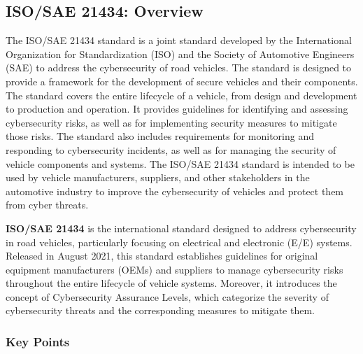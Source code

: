 \subsection{ISO/SAE 21434: Overview}\label{subsec:iso-sae-21434}

The ISO/SAE 21434 standard is a joint standard developed by the International Organization for Standardization (ISO) and the Society of Automotive Engineers (SAE) to address the cybersecurity of road vehicles.
The standard is designed to provide a framework for the development of secure vehicles and their components.
The standard covers the entire lifecycle of a vehicle, from design and development to production and operation.
It provides guidelines for identifying and assessing cybersecurity risks, as well as for implementing security measures to mitigate those risks.
The standard also includes requirements for monitoring and responding to cybersecurity incidents, as well as for managing the security of vehicle components and systems.
The ISO/SAE 21434 standard is intended to be used by vehicle manufacturers,
suppliers, and other stakeholders in the automotive industry to improve the cybersecurity of vehicles and protect them from cyber threats\cite{iso-correlation}.

\textbf{ISO/SAE 21434} is the international standard designed to address cybersecurity in road vehicles, particularly focusing on electrical and electronic (E/E) systems.
Released in August 2021, this standard establishes guidelines for original equipment manufacturers (OEMs) and suppliers to manage cybersecurity risks throughout the entire lifecycle of vehicle systems.
Moreover, it introduces the concept of Cybersecurity Assurance Levels, which categorize the severity of cybersecurity threats and the corresponding measures to mitigate them\cite{moukahal2021towards}.
\subsubsection{Key Points}\label{subsubsec:key-points-1}

